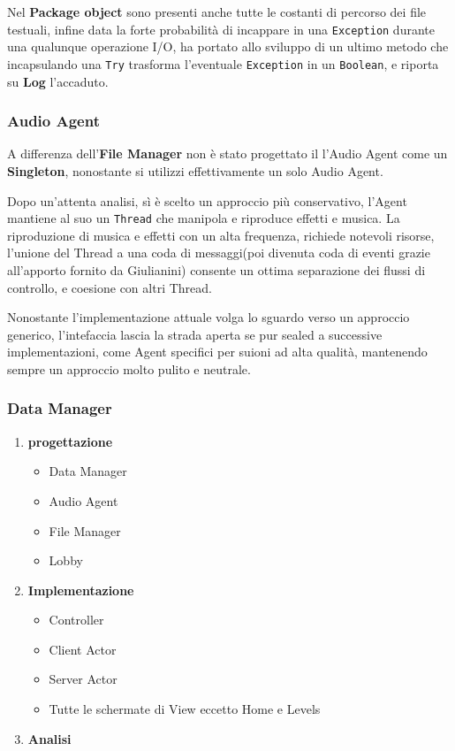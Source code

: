     Nel \textbf{Package object} sono presenti anche tutte le costanti 
    di percorso dei file testuali, infine data la forte probabilità di incappare in una \texttt{Exception} durante una qualunque operazione I/O, ha portato allo sviluppo di un ultimo metodo che incapsulando una \texttt{Try} trasforma l'eventuale  \texttt{Exception} in un \texttt{Boolean}, e riporta su \textbf{Log} l'accaduto.
    
    \subsubsection{Audio Agent}
    A differenza dell'\textbf{File Manager} non è stato progettato il l'Audio Agent come un \textbf{Singleton}, nonostante si utilizzi effettivamente un solo Audio Agent.
    
    Dopo un'attenta analisi, sì è scelto un approccio più conservativo, l'Agent mantiene al suo un \texttt{Thread} che 
    manipola e riproduce effetti e musica.
    La riproduzione di musica e effetti con un alta frequenza, richiede notevoli risorse, l'unione del Thread a una coda di messaggi(poi divenuta coda di eventi grazie all'apporto fornito da Giulianini) consente un ottima separazione dei flussi di controllo, e coesione con altri Thread.
    
    Nonostante l'implementazione attuale volga lo sguardo verso un approccio generico, l'intefaccia lascia la strada aperta se pur sealed a successive implementazioni, come Agent specifici per suioni ad alta qualità, mantenendo sempre un approccio molto pulito e neutrale.
    
    
    
    \subsubsection{Data Manager}


\begin{enumerate}
    \item \textbf{progettazione}
        \begin{itemize}
	        \item Data Manager
	        \item Audio Agent
	        \item File Manager
        	\item Lobby
        \end{itemize}
    \item \textbf{Implementazione}
        \begin{itemize}
            \item Controller
	        \item Client Actor
	        \item Server Actor
            \item Tutte le schermate di View eccetto Home e Levels
        \end{itemize}
    \item \textbf{Analisi}
\end{enumerate}


